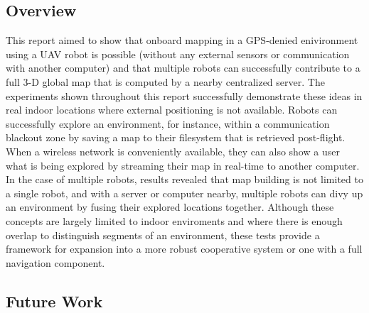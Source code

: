 \documentclass[letterpaper, oneside, 10pt]{report}
\begin{document}
\subsection{Overview}

This report aimed to show that onboard mapping in a GPS-denied enivironment using a UAV robot is possible (without any external sensors or communication with another computer) and that multiple robots can successfully contribute to a full 3-D global map that is computed by a nearby centralized server. The experiments shown throughout this report successfully demonstrate these ideas in real indoor locations where external positioning is not available. Robots can successfully explore an environment, for instance, within a communication blackout zone by saving a map to their filesystem that is retrieved post-flight. When a wireless network is conveniently available, they can also show a user what is being explored by streaming their map in real-time to another computer. In the case of multiple robots, results revealed that map building is not limited to a single robot, and with a server or computer nearby, multiple robots can divy up an environment by fusing their explored locations together. Although these concepts are largely limited to indoor enviroments and where there is enough overlap to distinguish segments of an environment, these tests provide a framework for expansion into a more robust cooperative system or one with a full navigation component.

\subsection{Future Work}
\end{document}
